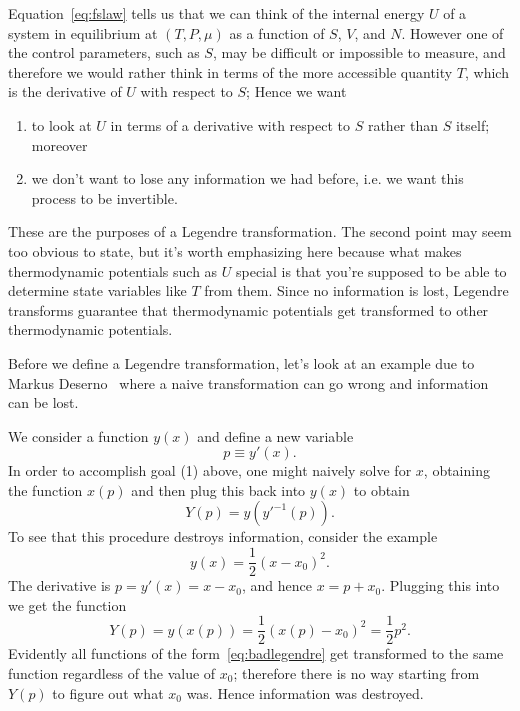 Equation~\eqref{eq:fslaw} tells us that we can think of the internal energy
$U$ of a system in equilibrium at $(T,P,\mu)$ as a function of $S$, $V$, and
$N$. However one of the control parameters, such as $S$, may be
difficult or impossible to measure, and therefore we would rather
think in terms of the more accessible quantity $T$, which 
is the derivative of $U$ with respect to $S$; 
Hence we want 
\begin{enumerate}
\item to look at $U$ in terms of a derivative with respect to $S$ rather 
      than $S$ itself; moreover 
\item we don't want to lose any information we had before, i.e. we want this
      process to be invertible. 
\end{enumerate}
These are the purposes of a Legendre transformation. The second point 
may seem too obvious to state, but it's worth emphasizing here because 
what makes thermodynamic potentials such as $U$ special is that you're 
supposed to be able to determine state variables like $T$ from them. 
Since no information is lost, Legendre transforms guarantee that 
thermodynamic potentials get transformed to other thermodynamic potentials.

Before we define a Legendre transformation, let's look at an example
due to Markus Deserno~\cite{deserno} where a naive transformation can go
wrong and information can be lost. 
\begin{example*}{}
We consider a function $y(x)$ and define a new variable
\begin{equation}\label{eq:xlegendre}
  p\equiv y'(x).
\end{equation}
In order to accomplish goal (1) above, one might naively solve
 for $x$, obtaining the function $x(p)$
and then plug this back into $y(x)$ to obtain
\begin{equation}
  Y(p)=y\left(y'^{-1}(p)\right).
\end{equation}
To see that this procedure destroys information, consider the example
\begin{equation}\label{eq:badlegendre}
  y(x)=\frac{1}{2}(x-x_0)^2.
\end{equation}
The derivative is $p=y'(x)=x-x_0$, and hence $x=p+x_0$. Plugging this
into  we get the function
\begin{equation}
  Y(p)=y(x(p))=\frac{1}{2}\left(x(p)-x_0\right)^2=\frac{1}{2}p^2.
\end{equation}
Evidently all functions of the form~\eqref{eq:badlegendre} get transformed
to the same function regardless of the value of $x_0$; therefore there is
no way starting from $Y(p)$ to figure out what $x_0$ was. Hence
information was destroyed.
\end{example*}

